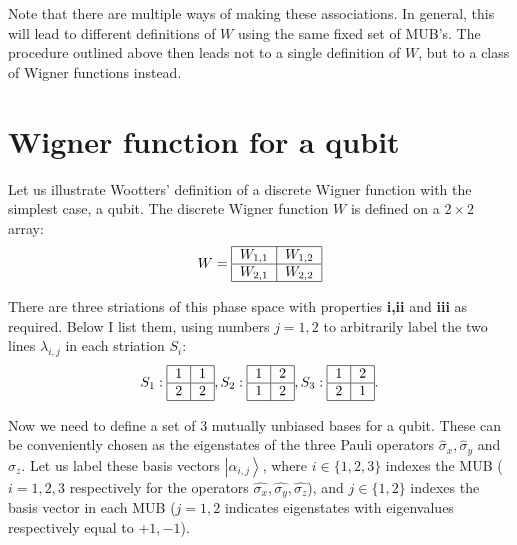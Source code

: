 \documentclass[aps,twocolumn,showpacs,nofootinbib,groupedaddress]{revtex4}
\begin{document}
Note that there are multiple ways of making these associations. In
general, this will lead to different definitions of $W$ using the
same fixed set of MUB's. The procedure outlined above then leads
not to a single definition of $W$, but to a class of Wigner
functions instead.

\section{Wigner function for a qubit}

Let us illustrate Wootters' definition of a discrete Wigner
function with the simplest case, a qubit. The discrete Wigner
function $W$ is defined on a $2 \times 2$ array:
\begin{equation}
W=
\begin{tabular}{|c|c|}\hline
$W_{1,1}$ & $W_{1,2}$ \\ \hline $W_{2,1}$ & $W_{2,2}$  \\\hline
\end{tabular}
\end{equation}

There are three striations of this phase space with properties
\textbf{i,ii} and \textbf{iii} as required. Below I list them,
using numbers $j=1,2$ to arbitrarily label the two lines
$\lambda_{i,j}$ in each striation $S_i$:
\begin{equation}
S_1:
\begin{tabular}{|c|c|}\hline
1 & 1 \\ \hline 2 & 2  \\\hline
\end{tabular},
S_2:
\begin{tabular}{|c|c|}\hline
1 & 2 \\ \hline 1 & 2  \\\hline
\end{tabular}
,S_3:
\begin{tabular}{|c|c|}\hline
1 & 2 \\ \hline 2 & 1  \\\hline
\end{tabular}.
\end{equation}

Now we need to define a set of 3 mutually unbiased bases for a
qubit. These can be conveniently chosen as the eigenstates of the
three Pauli operators $\hat{\sigma}_x, \hat{\sigma}_y$ and
$\hat{\sigma}_z$. Let us label these basis vectors
$\left|\alpha_{i,j}\right\rangle$, where $i\in\{1,2,3\}$ indexes
the MUB ($i=1,2,3$ respectively for the operators
$\hat{\sigma_x},\hat{\sigma_y},\hat{\sigma_z}$), and $j\in\{1,2\}$
indexes the basis vector in each MUB ($j=1,2$ indicates
eigenstates with eigenvalues respectively equal to $+1,-1$).
\end{document}
